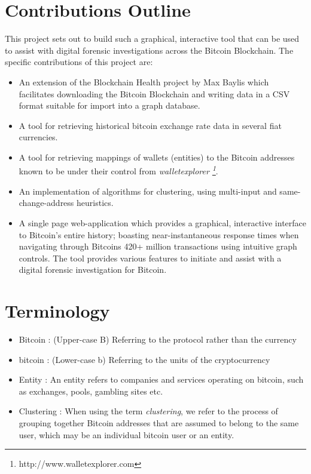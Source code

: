 \section{Contributions Outline}
This project sets out to build such a graphical, interactive tool that can be used to assist with digital forensic investigations across the Bitcoin Blockchain. The specific contributions of this project are:
\begin{itemize}
    \item An extension of the Blockchain Health project by Max Baylis which facilitates downloading the Bitcoin Blockchain and writing data in a CSV format suitable for import into a graph database.
    \item A tool for retrieving historical bitcoin exchange rate data in several fiat currencies.
    \item A tool for retrieving mappings of wallets (entities) to the Bitcoin addresses known to be under their control from \textit{walletexplorer \footnote{http://www.walletexplorer.com}}.
    \item An implementation of algorithms for clustering, using multi-input and same-change-address heuristics.
    \item A single page web-application which provides a graphical, interactive interface to Bitcoin's entire history; boasting near-instantaneous response times when navigating through Bitcoins 420+ million transactions \cite{RefWorks:doc:5cfba9cde4b0b8ab9a52e35c} using intuitive graph controls. The tool provides various features to initiate and assist with a digital forensic investigation for Bitcoin.
\end{itemize}


 \section{Terminology}
 \begin{itemize}
    \item Bitcoin : (Upper-case B) Referring to the protocol rather than the currency
    \item bitcoin : (Lower-case b) Referring to the units of the cryptocurrency
    \item Entity : An entity refers to companies and services operating on bitcoin, such as exchanges, pools, gambling sites etc. 
    \item Clustering : When using the term \textit{clustering}, we refer to the process of grouping together Bitcoin addresses that are assumed to belong to the same user, which may be an individual bitcoin user or an entity. 
 \end{itemize}